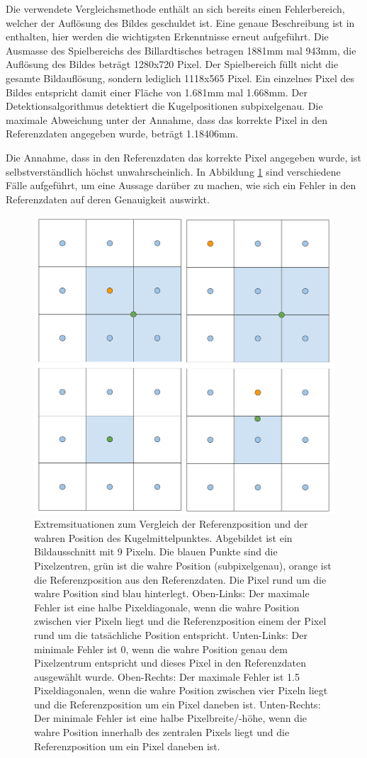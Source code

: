 Die verwendete Vergleichsmethode enthält an sich bereits einen Fehlerbereich, welcher der Auflösung des Bildes geschuldet ist.
Eine genaue Beschreibung ist in \cite{project2:fehler_grundwahrheit} enthalten, hier werden die wichtigsten Erkenntnisse
erneut aufgeführt.
Die Ausmasse des Spielbereichs des Billardtisches betragen 1881mm mal 943mm, die Auflösung des Bildes beträgt 1280x720 Pixel.
Der Spielbereich füllt nicht die gesamte Bildauflösung, sondern lediglich 1118x565 Pixel.
Ein einzelnes Pixel des Bildes entspricht damit einer Fläche von 1.681mm mal 1.668mm.
Der Detektionsalgorithmus detektiert die Kugelpositionen subpixelgenau.
Die maximale Abweichung unter der Annahme, dass das korrekte Pixel in den Referenzdaten angegeben wurde, beträgt 1.18406mm.

Die Annahme, dass in den Referenzdaten das korrekte Pixel angegeben wurde, ist selbstverständlich höchst unwahrscheinlich.
In Abbildung \ref{fig:detektion_resultate_min_max_fehler_referenzdaten} sind verschiedene Fälle aufgeführt,
um eine Aussage darüber zu machen, wie sich ein Fehler in den Referenzdaten auf deren Genauigkeit auswirkt.

\begin{figure}[h!]
    \begin{center}
        \includegraphics[width=0.5\linewidth]{../common/04_results/resources/detektion_min_und_max_fehler.png}
    \end{center}
    \caption{
        Extremsituationen zum Vergleich der Referenzposition und der wahren Position des Kugelmittelpunktes.
        Abgebildet ist ein Bildausschnitt mit 9 Pixeln. Die blauen Punkte sind die Pixelzentren, grün ist die wahre Position (subpixelgenau), orange ist die Referenzposition aus den Referenzdaten.
        Die Pixel rund um die wahre Position sind blau hinterlegt.
        Oben-Links: Der maximale Fehler ist eine halbe Pixeldiagonale, wenn die wahre Position zwischen vier Pixeln liegt und die Referenzposition einem der Pixel rund um die tatsächliche Position entspricht.
        Unten-Links: Der minimale Fehler ist $0$, wenn die wahre Position genau dem Pixelzentrum entspricht und dieses Pixel in den Referenzdaten ausgewählt wurde.
        Oben-Rechts: Der maximale Fehler ist 1.5 Pixeldiagonalen, wenn die wahre Position zwischen vier Pixeln liegt und die Referenzposition um ein Pixel daneben ist.
        Unten-Rechts: Der minimale Fehler ist eine halbe Pixelbreite/-höhe, wenn die wahre Position innerhalb des zentralen Pixels liegt und die Referenzposition um ein Pixel daneben ist.
    }
    \label{fig:detektion_resultate_min_max_fehler_referenzdaten}
\end{figure}

